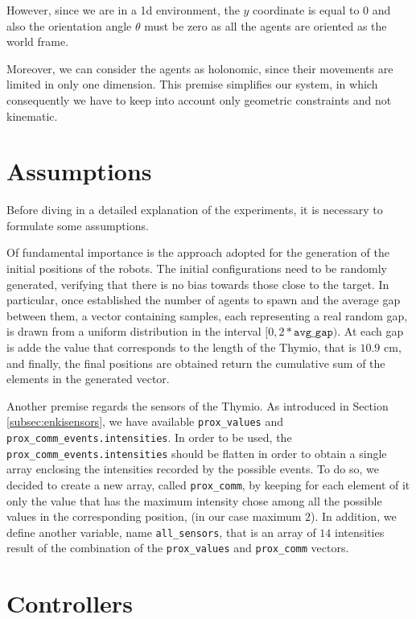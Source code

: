 However, since we are in a \gls{1d} environment, the $y$ coordinate is equal 
to $0$ and also the orientation angle $\theta$ must be zero as all the agents are 
oriented as the world frame. 

Moreover, we can consider the agents as holonomic, since their movements are 
limited in only one dimension. This premise simplifies our system, in which 
consequently we have to keep into account only geometric constraints and not
kinematic.

\section{Assumptions}
\label{sec:assum}
Before diving in a detailed explanation of the experiments, it is necessary to 
formulate some assumptions.

Of fundamental importance is the approach adopted for the generation of the 
initial positions of the robots.
The initial configurations need to be randomly generated, verifying that there is 
no bias towards those close to the target.
In particular, once established the number of agents to spawn and the average 
gap between them, a vector containing samples, each representing a real random 
gap, is drawn from a uniform distribution in the interval $[0, 
2*\mathtt{avg\_gap})$. 
At each gap is adde the value that corresponds to the length of the Thymio, that is 
$10.9$ \gls{cm}, and finally, the final positions are obtained return the cumulative 
sum of the elements in the generated vector. 

Another premise regards the sensors of the Thymio. 
As introduced in Section \ref{subsec:enkisensors}, we have available 
\texttt{prox\_values} and \texttt{prox\_comm\_events.intensities}. In order to be 
used, the \texttt{prox\_comm\_events.intensities} should be flatten in order to 
obtain a single array enclosing the intensities recorded by the possible events. 
To do so, we decided to create a new array, called \texttt{prox\_comm}, by 
keeping for each element of it only the value that has the maximum intensity 
chose among all the possible values in the corresponding position, (in our case 
maximum $2$).
In addition, we define another variable, name \texttt{all\_sensors}, that is an array 
of $14$ intensities result of the combination of the \texttt{prox\_values} and 
\texttt{prox\_comm} vectors.

\section{Controllers}
\label{sec:controllers}

